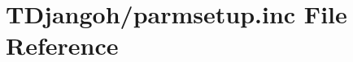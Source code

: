 \hypertarget{parmsetup_8inc}{\section{T\+Djangoh/parmsetup.inc File Reference}
\label{parmsetup_8inc}
}
